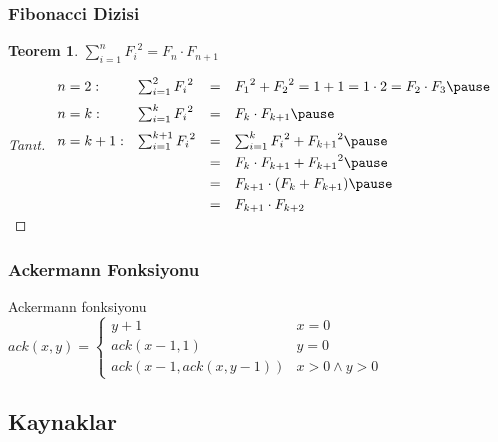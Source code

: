 \documentclass[dvipsnames]{beamer}
\theoremstyle{definition}
\theoremstyle{example}
\theoremstyle{plain}
\newtheorem{teorem}[theorem]{Teorem}
\begin{document}
\begin{frame}
  \frametitle{Fibonacci Dizisi}

  \begin{teorem}
    $\sum_{i=1}^{n} {F_i}^2 = F_n \cdot F_{n+1}$
  \end{teorem}

  \pause
  \begin{proof}[Tanıt]
    $\begin{array}{llcl}
      n=2:   & \sum_{i=1}^{2} {F_i}^2   & = & {F_1}^2+{F_2}^2=1+1=1 \cdot 2=F_2 \cdot F_3
      \pause
      \medskip\\
      n=k:   & \sum_{i=1}^{k} {F_i}^2   & = & F_k \cdot F_{k+1}
      \pause
      \medskip\\
      n=k+1: & \sum_{i=1}^{k+1} {F_i}^2 & = & \sum_{i=1}^{k} {F_i}^2 + {F_{k+1}}^2
      \pause
      \smallskip\\
             &                          & = & F_k \cdot F_{k+1} + {F_{k+1}}^2
      \pause
      \smallskip\\
             &                          & = & F_{k+1} \cdot (F_k + F_{k+1})
      \pause
      \smallskip\\
             &                          & = & F_{k+1} \cdot F_{k+2}
    \end{array}$
  \end{proof}
\end{frame}

\begin{frame}
  \frametitle{Ackermann Fonksiyonu}

  \begin{block}{Ackermann fonksiyonu}
    $ack(x,y) = \left\{
      \begin{array}{ll}
        y+1                 & x = 0\\
        ack(x-1, 1)         & y = 0\\
        ack(x-1,ack(x,y-1)) & x > 0 \wedge y > 0
      \end{array}
    \right.$
  \end{block}
\end{frame}

\subsection*{Kaynaklar}
\end{document}
